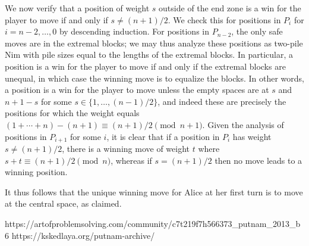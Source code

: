{    We now verify that a position of weight $s$ outside of the end zone is a win for the player to move if and only if $s \neq (n+1)/2$. We check this for positions in $P_i$ for $i = n-2, \dots, 0$ by descending induction. For positions in $P_{n-2}$, the only safe moves are in the extremal blocks; we may thus analyze these positions as two-pile Nim with pile sizes equal to the lengths of the extremal blocks. In particular, a position is a win for the player to move if and only if the extremal blocks are unequal, in which case the winning move is to equalize the blocks. In other words, a position is a win for the player to move unless the empty spaces are at $s$ and $n+1-s$ for some $s \in \{1,\dots,(n-1)/2\}$, and indeed these are precisely the positions for which the weight equals $(1 + \cdots + n) - (n+1) \equiv (n+1)/2 \pmod{n+1}$.
    Given the analysis of positions in $P_{i+1}$ for some $i$, it is clear that if a position in $P_i$ has weight $s \neq (n+1)/2$, there is a winning move of weight $t$ where $s+t \equiv (n+1)/2 \pmod{n}$,
    whereas if $s = (n+1)/2$ then no move leads to a winning position.

    It thus follows that the unique winning move for Alice at her first turn is to move at the central space, as claimed.
    }{%
    https://artofproblemsolving.com/community/c7t219f7h566373_putnam_2013_b6
    https://kskedlaya.org/putnam-archive/
}
